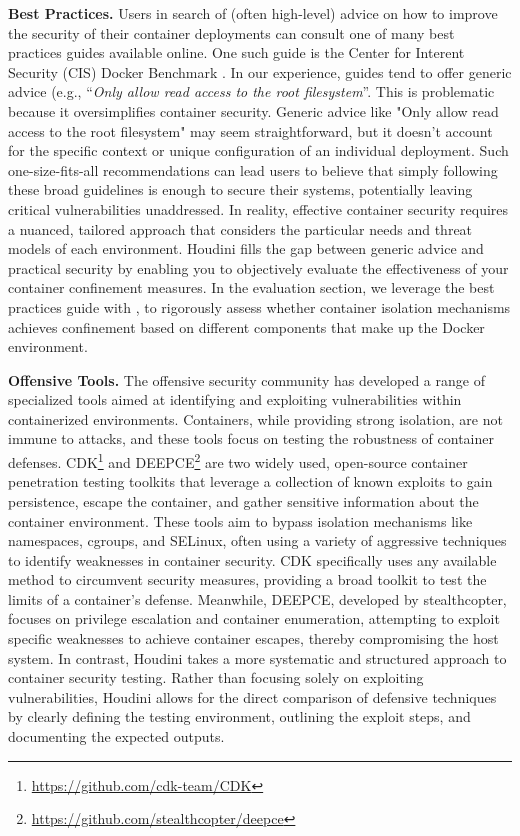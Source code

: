 \noindent\textbf{Best Practices.} Users in search of (often high-level) advice on how to improve the security of their container deployments can consult one of many best practices guides available online. One such guide is the Center for Interent Security (CIS) Docker Benchmark \cite{CIS}. In our experience, guides tend to offer generic advice (e.g., ``\textit{Only allow read access to the root filesystem}''. This is problematic because it oversimplifies container security. Generic advice like "Only allow read access to the root filesystem" may seem straightforward, but it doesn't account for the specific context or unique configuration of an individual deployment. Such one-size-fits-all recommendations can lead users to believe that simply following these broad guidelines is enough to secure their systems, potentially leaving critical vulnerabilities unaddressed. In reality, effective container security requires a nuanced, tailored approach that considers the particular needs and threat models of each environment. Houdini fills the gap between generic advice and practical security by enabling you to objectively evaluate the effectiveness of your container confinement measures. In the evaluation section, we leverage the best practices guide \cite{CIS} with \houdini, to rigorously assess whether container isolation mechanisms achieves confinement based on different components that make up the Docker environment.


\noindent\textbf{Offensive Tools.} The offensive security community has developed a range of specialized tools aimed at identifying and exploiting vulnerabilities within containerized environments. Containers, while providing strong isolation, are not immune to attacks, and these tools focus on testing the robustness of container defenses. CDK\footnote{\url{https://github.com/cdk-team/CDK}} and DEEPCE\footnote{\url{https://github.com/stealthcopter/deepce}} are two widely used, open-source container penetration testing toolkits that leverage a collection of known exploits to gain persistence, escape the container, and gather sensitive information about the container environment. These tools aim to bypass isolation mechanisms like namespaces, cgroups, and SELinux, often using a variety of aggressive techniques to identify weaknesses in container security. CDK specifically uses any available method to circumvent security measures, providing a broad toolkit to test the limits of a container’s defense. Meanwhile, DEEPCE, developed by stealthcopter, focuses on privilege escalation and container enumeration, attempting to exploit specific weaknesses to achieve container escapes, thereby compromising the host system. In contrast, Houdini takes a more systematic and structured approach to container security testing. Rather than focusing solely on exploiting vulnerabilities, Houdini allows for the direct comparison of defensive techniques by clearly defining the testing environment, outlining the exploit steps, and documenting the expected outputs.